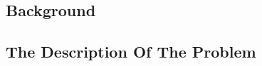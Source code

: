 \documentclass[../main]{subfiles}
\begin{document}
\subsection{Background}

\subsection{The Description Of The Problem}
\end{document}

